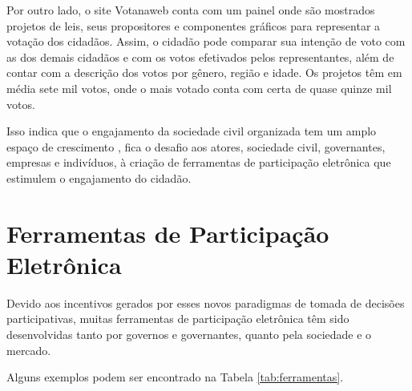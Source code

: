 \par
Por outro lado, o site Votanaweb conta com um painel onde são mostrados projetos de leis, seus propositores e componentes gráficos para representar a votação dos cidadãos.
Assim, o cidadão pode comparar sua intenção de voto com as dos demais cidadãos e com os votos efetivados pelos representantes, além de contar com a descrição dos votos por gênero, 
região e idade. Os projetos têm em média sete mil votos, onde o mais votado conta com certa de quase quinze mil votos. 

\par
Isso indica que o engajamento da sociedade civil organizada tem um amplo espaço de crescimento \cite{o2011government}, fica o desafio aos atores, sociedade civil, governantes, 
empresas e indivíduos, à criação de ferramentas de participação eletrônica que estimulem o engajamento do cidadão.

\newpage
\section{Ferramentas de Participação Eletrônica}
\label{sec:e-part tools}
Devido aos incentivos gerados por esses novos paradigmas de tomada de decisões participativas, muitas ferramentas de participação eletrônica têm sido desenvolvidas
tanto por governos e governantes, quanto pela sociedade e o mercado. 

\par
Alguns exemplos podem ser encontrado na Tabela \ref{tab:ferramentas}.

